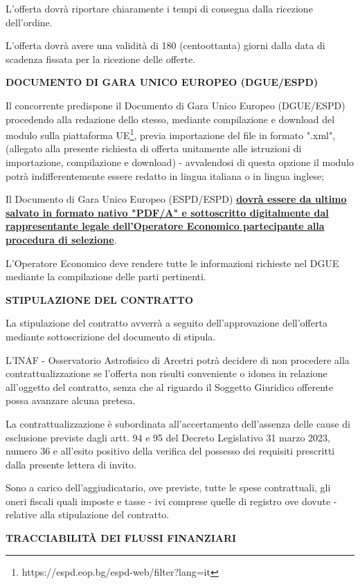 L'offerta dovrà riportare chiaramente i tempi di consegna dalla
ricezione dell'ordine.

L'offerta dovrà avere una validità di 180 (centoottanta) giorni
dalla data di scadenza fissata per la ricezione delle offerte.

\textbf{DOCUMENTO DI GARA UNICO EUROPEO (DGUE/ESPD)}

Il concorrente predispone il Documento di Gara Unico
Europeo (DGUE/ESPD) procedendo alla redazione dello stesso,
mediante compilazione e download del modulo sulla piattaforma
UE\footnote{https://espd.eop.bg/espd-web/filter?lang=it}, previa importazione del
file in formato ".xml", (allegato alla presente richiesta di offerta
unitamente alle istruzioni di importazione, compilazione e download) -
avvalendosi di questa opzione il modulo potrà indifferentemente essere
redatto in lingua italiana o in lingua inglese;

Il Documento di Gara Unico Europeo (ESPD/ESPD) \textbf{\ul{dovr\`a
essere da ultimo salvato in formato nativo "PDF/A" e sottoscritto
digitalmente dal rappresentante legale dell'Operatore Economico
partecipante alla procedura di selezione}}.

L'Operatore Economico deve rendere tutte le informazioni richieste
nel DGUE mediante la compilazione delle parti pertinenti.

\textbf{STIPULAZIONE DEL CONTRATTO}

La stipulazione del contratto avverrà a seguito dell'approvazione
dell'offerta mediante sottoscrizione del documento di stipula.

L'INAF - Osservatorio Astrofisico di Arcetri potrà decidere di non
procedere alla contrattualizzazione se l'offerta non risulti conveniente
o idonea in relazione all'oggetto del contratto, senza che al riguardo
il Soggetto Giuridico offerente possa avanzare alcuna pretesa.

La contrattualizzazione è subordinata all'accertamento dell'assenza
delle cause di esclusione previste dagli artt. 94 e 95 del Decreto
Legislativo 31 marzo 2023, numero 36 e all'esito positivo della verifica
del possesso dei requisiti prescritti dalla presente lettera di invito.

Sono a carico dell'aggiudicatario, ove previste, tutte le spese
contrattuali, gli oneri fiscali quali imposte e tasse - ivi comprese
quelle di registro ove dovute - relative alla stipulazione del contratto.

\textbf{TRACCIABILITÀ DEI FLUSSI FINANZIARI}


